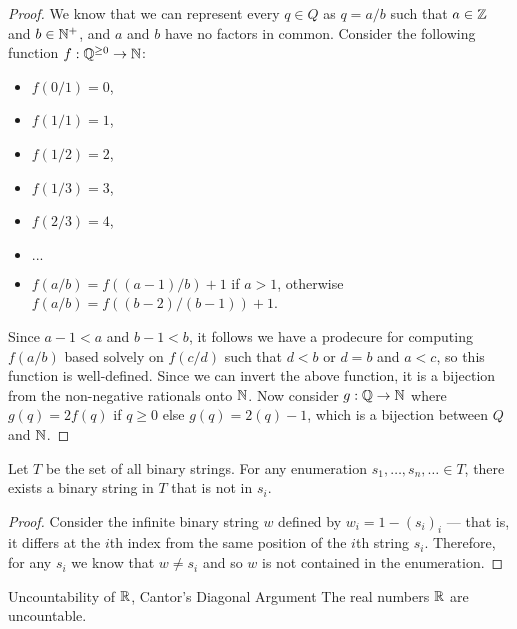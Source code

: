 \begin{proof}
    We know that we can represent every $q \in Q$ as $q = a/b$ such that $a \in \mathbb{Z}$ and $b \in \mathbb{N}^{+}$, and $a$ and $b$ have no factors in common. Consider the following function $f: \mathbb{Q}^{\geq 0} \to \mathbb{N}$:
    \begin{itemize}
        \item $f(0/1) = 0$,
        \item $f(1/1) = 1$,
        \item $f(1/2) = 2$,
        \item $f(1/3) = 3$,
        \item $f(2/3) = 4$,
        \item $...$
        \item $f(a/b) = f((a-1)/b) + 1$ if $a > 1$, otherwise $f(a/b) = f((b-2)/(b-1)) + 1$.
    \end{itemize}

    Since $a-1 < a$ and $b-1 < b$, it follows we have a prodecure for computing $f(a/b)$ based solvely on $f(c/d)$ such that $d < b$ or $d = b$ and $a < c$, so this function is well-defined. Since we can invert the above function, it is a bijection from the non-negative rationals onto $\mathbb{N}$. Now consider $g: \mathbb{Q} \to \mathbb{N}$ where $g(q) = 2f(q)$ if $q \geq 0$ else $g(q) = 2(q) - 1$, which is a bijection between $Q$ and $\mathbb{N}$.
\end{proof}

\begin{lemma}\label{diagonal-construction}\proofbreak
    Let $T$ be the set of all binary strings. For any enumeration $s_1, \ldots, s_n, \ldots \in T$, there exists a binary string in $T$ that is not in $s_i$.
\end{lemma}

\begin{proof}
    Consider the infinite binary string $w$ defined by $w_i = 1 - (s_i)_i$ --- that is, it differs at the $i$th index from the same position of the $i$th string $s_i$. Therefore, for any $s_i$ we know that $w \neq s_i$ and so $w$ is not contained in the enumeration.
\end{proof}

\begin{thm}{Uncountability of $\mathbb{R}$, Cantor's Diagonal Argument}\label{reals-uncountable}\proofbreak
    The real numbers $\mathbb{R}$ are uncountable.
\end{thm}

